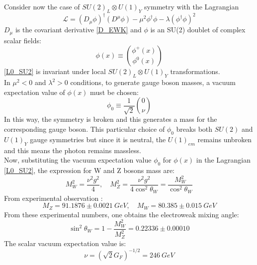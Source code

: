 Consider now the case of  $SU(2)_{L} \otimes U(1)_{Y}$ symmetry \cite{SU2_Hmechanism} with the Lagrangian
\begin{equation}
\mathcal{L} = (D_{\mu}\phi)^{\dagger}(D^{\mu}\phi)-\mu^{2}\phi^{\dagger}\phi-\lambda(\phi^{\dagger}\phi)^{2}
\label{L0_SU2}
\end{equation}
$D_{\mu}$ is the covariant derivative \ref{D_EWK} and $\phi$ is an SU(2) doublet of complex scalar fields:
\begin{equation}
\phi(x) \equiv {\phi^{+}(x) \choose \phi^0(x)}
\label{phi_SU2}
\end{equation}
\ref{L0_SU2} is invariant under local $SU(2)_{L} \otimes U(1)_{Y}$ transformations. \\
In $\mu^{2} < 0$ and $\lambda^{2} > 0$ conditions, to generate gauge boson masses, a vacuum expectation value of $\phi(x)$ must be chosen:
\begin{equation}
\phi_{0} \equiv \frac{1}{\sqrt{2}}{0 \choose \nu}
\label{SU2_U1_V0}
\end{equation}
In this way, the symmetry is broken and this generates a mass for the corresponding gauge boson. This particular choice of $\phi_{0}$ breaks both $SU(2)$ and $U(1)_{Y}$ gauge symmetries but since it is neutral, the $U(1)_{em}$ remains unbroken and this means the photon remains massless. \\
Now, substituting the vacuum expectation value $\phi_{0}$ for $\phi(x)$ in the Lagrangian \ref{L0_SU2}, the expression for W and Z bosons mass are:
\begin{equation}
M_{W}^{2} = \frac{\nu^{2}g^{2}}{4}, \quad M_{Z}^{2} = \frac{\nu^{2}g^{2}}{4\cos^{2}\theta_{W}}=\frac{M_{W}^{2}}{\cos^{2}{\theta_{W}}}
\label{WZ_mass_expression}
\end{equation}
From experimental observation \cite{PDG}:
\begin{equation}
M_{Z} = 91.1876\pm0.0021\ GeV, \quad M_{W} = 80.385\pm 0.015\ GeV
\end{equation}
From these experimental numbers, one obtains the electroweak mixing angle:
\begin{equation}
\sin^{2}\theta_{W} = 1-\frac{M^{2}_{W}}{M^{2}_{Z}} = 0.22336 \pm 0.00010
\end{equation}
The scalar vacuum expectation value is:
\begin{equation}
\nu=(\sqrt{2}G_{F})^{-1/2}=246\ GeV
\end{equation}
